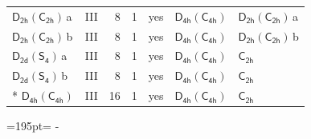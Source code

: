 \documentclass[10pt,a4paper]{article}
\newcommand{\needspace}[1]{\par\penalty-100\begingroup\dimen0=#1\relax\dimen2=\pagegoal
  \advance\dimen2-\pagetotal\ifdim\dimen0>\dimen2\relax\ifdim\dimen2>0pt\vfil\break\fi\fi
  \endgroup}
\numberwithin{equation}{section}
\newcommand{\grp}[1]{\mathsf{#1}}
\newcommand{\clsletter}[1]{\,{\scriptsize\color{black!55}#1}}
\begin{document}
{\begin{longtable}{@{}llrrlll@{}}
\href{D2h-C2h.pdf}{$\grp{D_{2h}}(\grp{C_{2h}})$}\clsletter{a} & III & 8 & 1 & yes & \href{D4h-C4h.pdf}{$\grp{D_{4h}}(\grp{C_{4h}})$} & \href{D2h-C2h.pdf}{$\grp{D_{2h}}(\grp{C_{2h}})$}\clsletter{a}\\
\href{D2h-C2h.pdf}{$\grp{D_{2h}}(\grp{C_{2h}})$}\clsletter{b} & III & 8 & 1 & yes & \href{D4h-C4h.pdf}{$\grp{D_{4h}}(\grp{C_{4h}})$} & \href{D2h-C2h.pdf}{$\grp{D_{2h}}(\grp{C_{2h}})$}\clsletter{b}\\
\href{D2d-S4.pdf}{$\grp{D_{2d}}(\grp{S_{4}})$}\clsletter{a} & III & 8 & 1 & yes & \href{D4h-C4h.pdf}{$\grp{D_{4h}}(\grp{C_{4h}})$} & \href{../../../rotation/data/pdf/C2h.pdf}{$\grp{C_{2h}}$}\\
\href{D2d-S4.pdf}{$\grp{D_{2d}}(\grp{S_{4}})$}\clsletter{b} & III & 8 & 1 & yes & \href{D4h-C4h.pdf}{$\grp{D_{4h}}(\grp{C_{4h}})$} & \href{../../../rotation/data/pdf/C2h.pdf}{$\grp{C_{2h}}$}\\*
\href{D4h-C4h.pdf}{$\grp{D_{4h}}(\grp{C_{4h}})$} & III & 16 & 1 & yes & \href{D4h-C4h.pdf}{$\grp{D_{4h}}(\grp{C_{4h}})$} & \href{../../../rotation/data/pdf/C2h.pdf}{$\grp{C_{2h}}$}\\
\bottomrule\end{longtable}}
\needspace{195pt}
\end{document}
